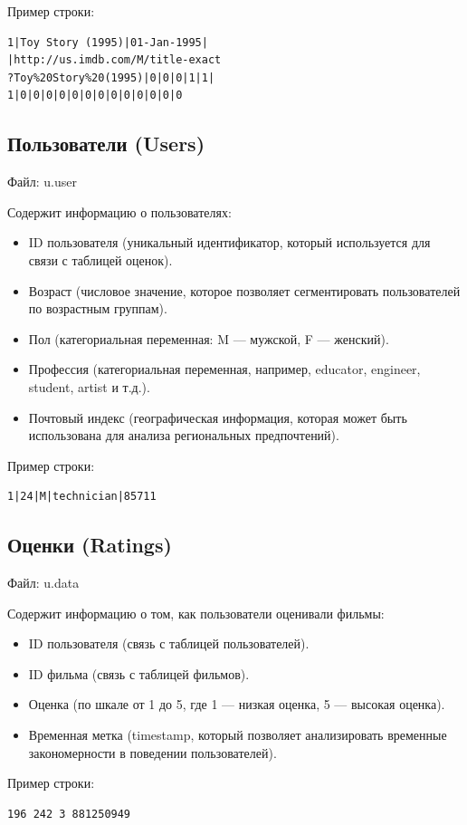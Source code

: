 Пример строки:
\begin{verbatim}
1|Toy Story (1995)|01-Jan-1995|
|http://us.imdb.com/M/title-exact
?Toy%20Story%20(1995)|0|0|0|1|1|
1|0|0|0|0|0|0|0|0|0|0|0|0|0
\end{verbatim}

\subsection*{Пользователи (Users)}
Файл: u.user

Содержит информацию о пользователях:
\begin{itemize}
    \item ID пользователя (уникальный идентификатор, который используется для связи с таблицей оценок).
    \item Возраст (числовое значение, которое позволяет сегментировать пользователей по возрастным группам).
    \item Пол (категориальная переменная: M — мужской, F — женский).
    \item Профессия (категориальная переменная, например, educator, engineer, student, artist и т.д.).
    \item Почтовый индекс (географическая информация, которая может быть использована для анализа региональных предпочтений).
\end{itemize}

Пример строки:
\begin{verbatim}
1|24|M|technician|85711
\end{verbatim}

\subsection*{Оценки (Ratings)}
Файл: u.data

Содержит информацию о том, как пользователи оценивали фильмы:
\begin{itemize}
    \item ID пользователя (связь с таблицей пользователей).
    \item ID фильма (связь с таблицей фильмов).
    \item Оценка (по шкале от 1 до 5, где 1 — низкая оценка, 5 — высокая оценка).
    \item Временная метка (timestamp, который позволяет анализировать временные закономерности в поведении пользователей).
\end{itemize}

Пример строки:
\begin{verbatim}
196 242 3 881250949
\end{verbatim}


